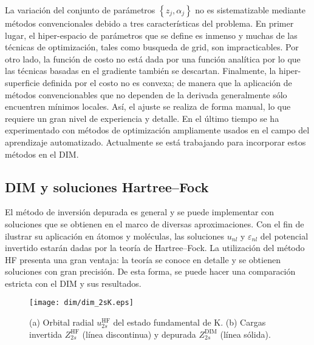 La variación del conjunto de parámetros $\left\{z_j,\alpha_j\right\}$ no 
es sistematizable mediante métodos convencionales debido a tres 
características del problema. En primer lugar, el hiper-espacio de 
parámetros que se define es inmenso y muchas de las técnicas de 
optimización, tales como busqueda de grid, son impracticables. Por otro 
lado, la función de costo no está dada por una función analítica por lo 
que las técnicas basadas en el gradiente también se descartan. 
Finalmente, la hiper-superficie definida por el costo no es convexa; de 
manera que la aplicación de métodos convencionables que no dependen de 
la derivada generalmente sólo encuentren mínimos locales. Así, el ajuste 
se realiza de forma manual, lo que requiere un gran nivel de experiencia 
y detalle. En el último tiempo se ha experimentado con métodos de 
optimización ampliamente usados en el campo del aprendizaje 
automatizado. Actualmente se está trabajando para incorporar estos 
métodos en el DIM.

\subsection{DIM y soluciones Hartree--Fock}
\label{subsec:invHF}

El método de inversión depurada es general y se puede implementar con 
soluciones que se obtienen en el marco de diversas aproximaciones. Con 
el fin de ilustrar su aplicación en átomos y moléculas, las soluciones 
$u_{nl}$ y $\varepsilon_{nl}$ del potencial invertido estarán dadas por 
la teoría de Hartree--Fock. La utilización del método HF presenta una 
gran ventaja: la teoría se conoce en detalle y se obtienen soluciones 
con gran precisión. De esta forma, se puede hacer una comparación 
estricta con el DIM y sus resultados.

\begin{figure}[t]
\centering
\texttt{[image: dim/dim\_2sK.eps]} 
\caption[Orbital radial y carga efectiva correspondiente.]
{(a) Orbital radial $u_{2s}^{\mathrm{HF}}$ del estado fundamental de K.
(b) Cargas invertida $Z_{2s}^{\mathrm{HF}}$ (línea discontinua) 
y depurada $Z_{2s}^{\mathrm{DIM}}$ (línea sólida).}
\label{fig:2sK}
\end{figure}

